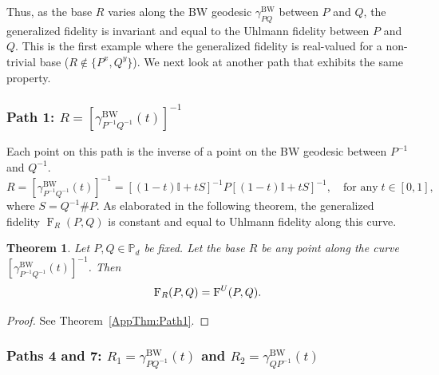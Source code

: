 \documentclass[12pt]{article}
\newtheorem{theorem}{Theorem}[section] %
\theoremstyle{definition}
\begin{document}
Thus, as the base $R$ varies along the BW geodesic $\gamma_{P Q}^{\text{BW}}$ between $P$ and $Q$, the generalized fidelity is invariant and equal to the Uhlmann fidelity between $P$ and $Q$. This is the first example where the generalized fidelity is real-valued for a non-trivial base ($R \notin \{P^x, Q^y\}$). We next look at another path that exhibits the same property.




\subsubsection*{Path 1: \texorpdfstring{$R = [\gamma^{\mathrm{BW}}_{P^{-1} Q^{-1}}(t)]^{-1}$}{R = [gamma(BW)]^{-1}}}


Each point on this path is the inverse of a point on the BW geodesic between $P^{-1}$ and $Q^{-1}$. 
\begin{equation}
R =  [\gamma^{\mathrm{BW}}_{P^{-1} Q^{-1}}(t)]^{-1} = \left[(1-t)\mathbb{I} + t S \right]^{-1} P \left[(1-t)\mathbb{I} + t S \right]^{-1}, \quad \text{for any} \; t \in [0,1],
\end{equation}
where $S = Q ^{-1} \# P$. As elaborated in the following theorem, the generalized fidelity $\operatorname{F}_R(P,Q) $ is constant and equal to Uhlmann fidelity along this curve.
\begin{theorembox}
    \begin{theorem} \label{Thm:Path1}
        Let $P, Q \in \mathbb P_d$ be fixed. Let the base $R$ be any point along the curve $[\gamma^{\mathrm{BW}}_{P^{-1} Q^{-1}}(t)]^{-1}$. Then
        \begin{equation}
            \operatorname{F}_R(P,Q) = \operatorname{F}^{\emph U}(P,Q). 
        \end{equation}
    \end{theorem}
\end{theorembox}

\begin{proof}
    See Theorem~\ref{AppThm:Path1}. 
\end{proof}








\subsubsection*{Paths 4 and 7: $R_1 = \gamma^{\mathrm{BW}}_{PQ^{-1}}(t)$ and $R_2 = \gamma^{\mathrm{BW}}_{QP^{-1}}(t)$}
\end{document}
